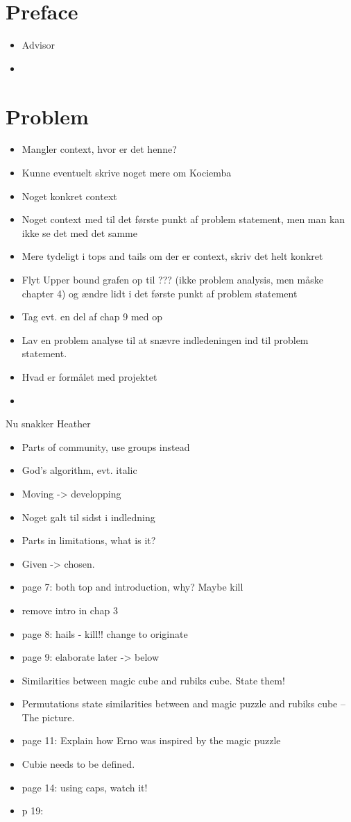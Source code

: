 \documentclass{article}
\begin{document}
\section{Preface}
\begin{itemize}
	\item Advisor
	\item 
\end{itemize}

\section{Problem}
\begin{itemize}
	\item Mangler context, hvor er det henne?
	\item Kunne eventuelt skrive noget mere om Kociemba
	\item Noget konkret context
	\item Noget context med til det første punkt af problem statement, men man kan ikke se det med det samme
	\item Mere tydeligt i tops and tails om der er context, skriv det helt konkret
	\item Flyt Upper bound grafen op til ??? (ikke problem analysis, men måske chapter 4) og ændre lidt i det første punkt af problem statement
	\item Tag evt. en del af chap 9 med op
	\item Lav en problem analyse til at snævre indledeningen ind til problem statement.
	\item Hvad er formålet med projektet
	\item 
\end{itemize}


Nu snakker Heather
\begin{itemize}
	\item Parts of community, use groups instead
	\item God's algorithm, evt. italic
	\item Moving -> developping
	\item Noget galt til sidst i indledning
	\item Parts in limitations, what is it?
	\item Given -> chosen.
	\item page 7: both top and introduction, why? Maybe kill
	\item remove intro in chap 3
	\item page 8: hails - kill!! change to originate
	\item page 9: elaborate later -> below
	\item Similarities between magic cube and rubiks cube. State them!
	\item Permutations state similarities between and magic puzzle and rubiks cube -- The picture.
	\item page 11: Explain how Erno was inspired by the magic puzzle
	\item Cubie needs to be defined.
	\item page 14: using caps, watch it!
	\item p 19: 
\end{itemize}
\end{document}
